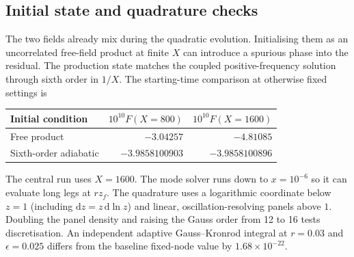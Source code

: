 \documentclass[11pt,a4paper]{article}
\newcommand{\dd}{\mathrm d}
\begin{document}
\subsection{Initial state and quadrature checks}
The two fields already mix during the quadratic evolution. Initialising them as an uncorrelated free-field product at finite $X$ can introduce a spurious phase into the residual. The production state matches the coupled positive-frequency solution through sixth order in $1/X$. The starting-time comparison at otherwise fixed settings is
\begin{center}\begin{tabular}{lrr}\toprule Initial condition & $10^{10}F(X=800)$ & $10^{10}F(X=1600)$\\\midrule
Free product & $-3.04257$ & $-4.81085$\\
Sixth-order adiabatic & $-3.9858100903$ & $-3.9858100896$\\\bottomrule\end{tabular}\end{center}
The central run uses $X=1600$. The mode solver runs down to $x=10^{-6}$ so it can evaluate long legs at $rz_f$. The quadrature uses a logarithmic coordinate below $z=1$ (including $\dd z=z\,\dd\ln z$) and linear, oscillation-resolving panels above $1$. Doubling the panel density and raising the Gauss order from 12 to 16 tests discretisation. An independent adaptive Gauss--Kronrod integral at $r=0.03$ and $\epsilon=0.025$ differs from the baseline fixed-node value by $1.68\times10^{-22}$.
\end{document}
